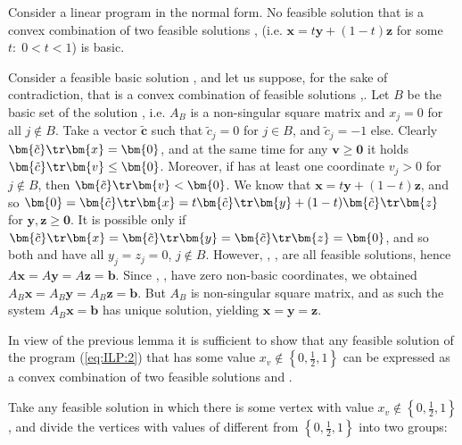 \begin{lema}
  \label{lm:konvex}
  Consider a linear program in the normal form. No feasible solution  that is a convex combination
  of two feasible solutions , (i.e.  $\bm{x}=t\bm{y}+(1-t)\bm{z}$ for 
  some  $t:\;0<t<1$) is basic.
\end{lema}
\begin{dokaz}
  Consider a feasible basic solution , and let us suppose, for the sake of contradiction, that 
   is a convex combination of feasible solutions ,. Let $B$ be the basic set of 
  the solution , i.e. $A_B$ is a non-singular square matrix and $x_j=0$ for all $j\not\in B$.
  Take a vector  $\bm{\tilde{c}}$ such that $\tilde{c}_j=0$ for  $j\in B$, and $\tilde{c}_j=-1$ else.
  Clearly
  $\bm{\tilde{c}}\tr\bm{x}=\bm{0}$, and at the same time for any $\bm{v}\ge\bm{0}$
  it holds $\bm{\tilde{c}}\tr\bm{v}\le\bm{0}$. Moreover, if  has at least one coordinate
  $v_j>0$ for $j\not\in B$, then $\bm{\tilde{c}}\tr\bm{v}<\bm{0}$.
%
  We know that $\bm{x}=t\bm{y}+(1-t)\bm{z}$, and so
  $\bm{0}=\bm{\tilde{c}}\tr\bm{x}=t\bm{\tilde{c}}\tr\bm{y}+(1-t)\bm{\tilde{c}}\tr\bm{z}$
  for $\bm{y},\bm{z}\ge\bm{0}$. It is possible only if 
  $\bm{\tilde{c}}\tr\bm{x}=\bm{\tilde{c}}\tr\bm{y}=\bm{\tilde{c}}\tr\bm{z}=\bm{0}$,
  and so both  and  have all  $y_j=z_j=0$, $j\not\in B$.
%
  However, , ,  are all feasible solutions, hence $A\bm{x}=A\bm{y}=A\bm{z}=\bm{b}$.
  Since , ,  have zero non-basic coordinates, we obtained
  $A_B\bm{x}=A_B\bm{y}=A_B\bm{z}=\bm{b}$. But $A_B$ is non-singular square matrix, and as such 
  the system $A_B\bm{x}=\bm{b}$ has unique solution, yielding
  $\bm{x}=\bm{y}=\bm{z}$.
\end{dokaz}

\noindent
In view of the previous lemma it is sufficient to show that any feasible solution  of the program
(\ref{eq:ILP:2}) that has some value  $x_v\not\in\left\{0,\frac{1}{2},1\right\}$ can be expressed
as a convex combination of two feasible solutions  and .

\noindent
Take any feasible solution  in which there is some vertex with value 
$x_v\not\in\left\{0,\frac{1}{2},1\right\}$, and divide the vertices with values of  different 
from $\left\{0,\frac{1}{2},1\right\}$ into two groups: 

